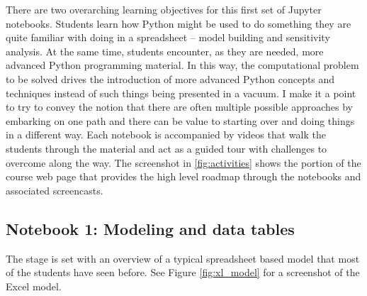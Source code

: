 \documentclass[ited,blindrev]{informs3}              %
\begin{document}
There are two overarching learning objectives for this first set of Jupyter notebooks. Students learn how Python might be used to do something they are quite familiar with doing in a spreadsheet -- model building and sensitivity analysis. At the same time, students encounter, as they are needed, more advanced Python programming material. In this way, the computational problem to be solved drives the introduction of more advanced Python concepts and techniques instead of such things being presented in a vacuum. I make it a point to try to convey the notion that there are often multiple possible approaches by embarking on one path and there can be value to starting over and doing things in a different way. Each notebook is accompanied by videos that walk the students through the material and act as a guided tour with challenges to overcome along the way. The screenshot in \ref{fig:activities} shows the portion of the course web page that provides the high level roadmap through the notebooks and associated screencasts.
 
 
\subsection{Notebook 1: Modeling and data tables}

The stage is set with an overview of a typical spreadsheet based model that most of the students have seen before. See Figure \ref{fig:xl_model} for a screenshot of the Excel model.
\end{document}
